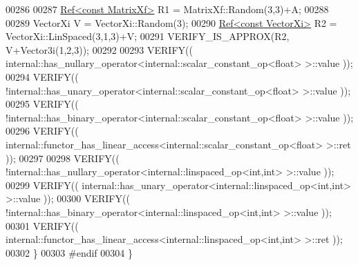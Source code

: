 \begin{DoxyCode}
00286 
00287     \hyperlink{group___core___module_class_eigen_1_1_ref}{Ref<const MatrixXf>} R1 = MatrixXf::Random(3,3)+A;
00288 
00289     VectorXi V = VectorXi::Random(3);
00290     \hyperlink{group___core___module_class_eigen_1_1_ref}{Ref<const VectorXi>} R2 = VectorXi::LinSpaced(3,1,3)+V;
00291     VERIFY\_IS\_APPROX(R2, V+Vector3i(1,2,3));
00292 
00293     VERIFY((  internal::has\_nullary\_operator<internal::scalar\_constant\_op<float> >::value ));
00294     VERIFY(( !internal::has\_unary\_operator<internal::scalar\_constant\_op<float> >::value ));
00295     VERIFY(( !internal::has\_binary\_operator<internal::scalar\_constant\_op<float> >::value ));
00296     VERIFY((  internal::functor\_has\_linear\_access<internal::scalar\_constant\_op<float> >::ret ));
00297 
00298     VERIFY(( !internal::has\_nullary\_operator<internal::linspaced\_op<int,int> >::value ));
00299     VERIFY((  internal::has\_unary\_operator<internal::linspaced\_op<int,int> >::value ));
00300     VERIFY(( !internal::has\_binary\_operator<internal::linspaced\_op<int,int> >::value ));
00301     VERIFY((  internal::functor\_has\_linear\_access<internal::linspaced\_op<int,int> >::ret ));
00302   \}
00303 \textcolor{preprocessor}{#endif}
00304 \}
\end{DoxyCode}
